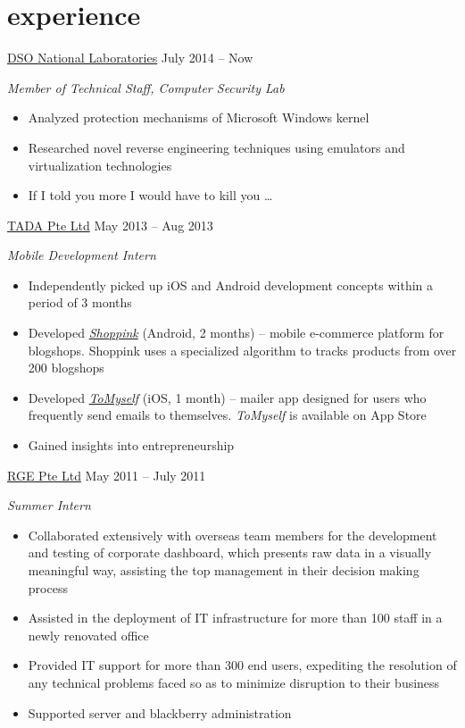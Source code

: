 \documentclass{friggeri-cv} %
\begin{document}
\vspace{-2.2\parsep}
\section{experience}

\entry
{\href{https://www.dso.org.sg/}{DSO National Laboratories}}
{July 2014 -- Now}
{\emph{Member of Technical Staff, Computer Security Lab}
\begin{itemize}
\item Analyzed protection mechanisms of Microsoft Windows kernel
\item Researched novel reverse engineering techniques using emulators and virtualization technologies
\item If I told you more I would have to kill you \dots
\end{itemize}}
\entry
{\href{http://www.shoppink.me/}{TADA Pte Ltd}}
{May 2013 -- Aug 2013}
{\emph{Mobile Development Intern}
\begin{itemize}
\item Independently picked up iOS and Android development concepts within a period of 3 months
\item Developed \href{http://www.shoppink.me/}{\emph{Shoppink}} (Android, 2 months) -- mobile e-commerce platform for blogshops. Shoppink uses a specialized algorithm to tracks products from over 200 blogshops
\item Developed \href{http://www.shoppink.me/tomyself}{\emph{ToMyself}} (iOS, 1 month) -- mailer app designed for users who frequently send emails to themselves. \emph{ToMyself} is available on App Store
\item Gained insights into entrepreneurship 
\end{itemize}}
\entry
{\href{http://www.rgei.com/}{RGE Pte Ltd}}
{May 2011 -- July 2011}
{\emph{Summer Intern}
\begin{itemize}
\item Collaborated extensively with overseas team members for the development and testing of corporate dashboard, which presents raw data in a visually meaningful way, assisting the top management in their decision making process 
\item Assisted in the deployment of IT infrastructure for more than 100 staff in a newly renovated office
\item Provided IT support for more than 300 end users, expediting the resolution of any technical problems faced so as to minimize disruption to their business
\item Supported server and blackberry administration
\end{itemize}}
\end{document}
